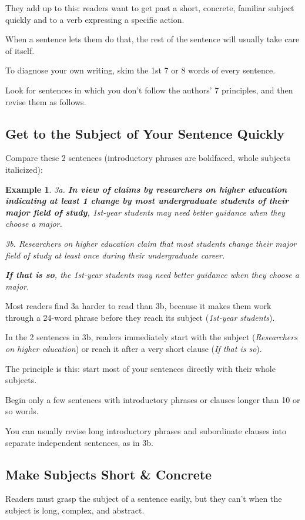 \documentclass[oneside]{book}
\numberwithin{equation}{section}
\newtheorem{example}{Example}[section]
\begin{document}
They add up to this: readers want to get past a short, concrete, familiar subject quickly and to a verb expressing a specific action.

When a sentence lets them do that, the rest of the sentence will usually take care of itself.

To diagnose your own writing, skim the 1st 7 or 8 words of every sentence.

Look for sentences in which you don't follow the authors' 7 principles, and then revise them as follows.

\subsection{Get to the Subject of Your Sentence Quickly}
Compare these 2 sentences (introductory phrases are boldfaced, whole subjects italicized):
\begin{example}
    3a. \textbf{In view of claims by researchers on higher education indicating at least 1 change by most undergraduate students of their major field of study}, \emph{1st-year students} may need better guidance when they choose a major.
    
    3b. \emph{Researchers on higher education} claim that \emph{most students} change their major field of study at least once during their undergraduate career.
    
    \textbf{If that is so}, the \emph{1st-year students} may need better guidance when they choose a major.
\end{example}
Most readers find 3a harder to read than 3b, because it makes them work through a 24-word phrase before they reach its subject (\textit{1st-year students}).

In the 2 sentences in 3b, readers immediately start with the subject (\textit{Researchers on higher education}) or reach it after a very short clause (\textit{If that is so}).

%
The principle is this: start most of your sentences directly with their whole subjects.

Begin only a few sentences with introductory phrases or clauses longer than 10 or so words.

You can usually revise long introductory phrases and subordinate clauses into separate independent sentences, as in 3b.

\subsection{Make Subjects Short \& Concrete}
Readers must grasp the subject of a sentence easily, but they can't when the subject is long, complex, and abstract.
\end{document}

